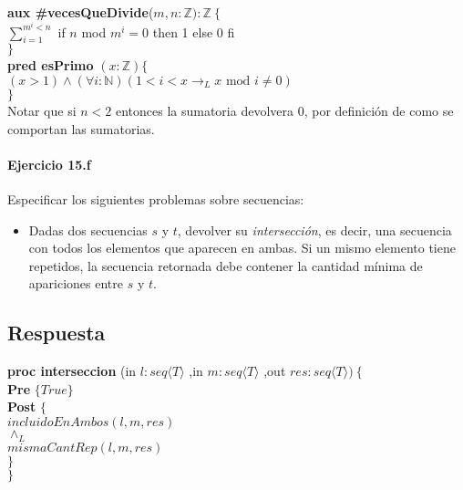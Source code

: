\documentclass[a4paper]{article}
\begin{document}
			\textbf{aux \#vecesQueDivide}($m,n: \mathbb{Z}):\mathbb{Z}
			\ \{$\smallskip \\
			\hspace*{6mm}$\sum_{i=1}^{m^i<n}$ if $n$ mod $m^i=0$ then 1 else 0 fi\\
			\hspace*{5mm}$\}$\smallskip \\
			
			\textbf{pred esPrimo} $(x: \mathbb{Z})\{$\\ 
			\hspace*{6mm}$ (x > 1)\wedge(\forall i :\mathbb{N})
			(1<i<x \rightarrow _L x\textrm{ mod }i\neq 0 )$\\
			\hspace*{5mm}$\}$\smallskip \\
			
Notar que si $n<2$ entonces la sumatoria devolvera 0, por definición de como se comportan las 
sumatorias.
			
\paragraph*{Ejercicio 15.f} Especificar los siguientes problemas sobre secuencias:
	\begin{itemize}
		\item Dadas dos secuencias $s$ y $t$, devolver su \textit{intersección}, es
				decir, una secuencia con todos los elementos que aparecen en ambas. Si un mismo
				elemento tiene repetidos, la secuencia retornada debe contener la cantidad
				mínima de apariciones entre $s$ y $t$.
	\end{itemize}

\subsection*{Respuesta}

			\textbf{proc interseccion }(in $l:seq\langle T\rangle$
				,in $m:seq\langle T\rangle$
				,out $res:seq\langle T\rangle )\ \{$\smallskip \\
			\hspace*{6mm} \textbf{Pre }$\{ True\}$\smallskip \\
			\hspace*{6mm} \textbf{Post }$\{$\\
			\hspace*{6mm} $incluidoEnAmbos(l,m,res)$\\
			\hspace*{6mm} $\wedge_L$\\
			\hspace*{6mm} $mismaCantRep(l,m,res)$\\
			\hspace*{6mm} $\}$\\
			\hspace*{5mm}$\}$\smallskip \\
			
\end{document}
